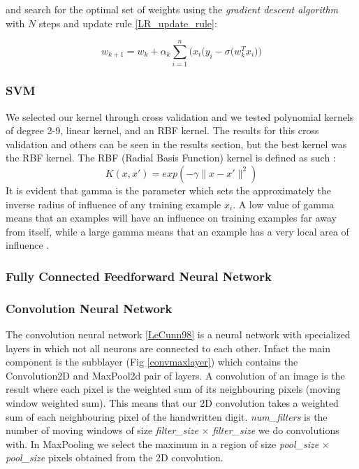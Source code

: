 \documentclass[conference]{IEEEtran}
\begin{document}
and search for the optimal set of weights using the \emph{gradient descent algorithm} with $N$ steps and update rule \ref{LR_update_rule}:

\begin{equation}
\label{LR_update_rule}
	w_{k+1} = w_k + \alpha_k \sum_{i=1}^n \Big( x_i\big(y_i - \sigma(w_k^Tx_i\big) \Big)
\end{equation}


\subsubsection{SVM}
We selected our kernel through cross validation and we tested polynomial kernels of degree 2-9, linear kernel, and an RBF kernel. The results for this cross validation and others can be seen in the results section, but the best kernel was the RBF kernel. The RBF (Radial Basis Function) kernel is defined as such \cite{Hastie}: \[K(x,x\prime )=exp(-\gamma\|x-x\prime \|^2)\] It is evident that gamma is the parameter which sets the approximately the inverse radius of influence of any training example $x_i$. A low value of gamma means that an examples will have an influence on training examples far away from itself, while a large gamma means that an example has a very local area of influence \cite{sklearn}.

\subsubsection{Fully Connected Feedforward Neural Network}

\subsubsection{Convolution Neural Network}
The convolution neural network \ref{LeCunn98} is a neural network with specialized layers in which not all neurons are connected to each other. Infact the main component is the subblayer (Fig \ref{convmaxlayer}) which contains the Convolution2D and MaxPool2d pair of layers. A convolution of an image is the result where each pixel is the weighted sum of its neighbouring pixels (moving window weighted sum). This means that our 2D convolution takes a weighted sum of each neighbouring pixel of the handwritten digit. \emph{num\_filters} is the number of moving windows of size \emph{filter\_size} $\times$ \emph{filter\_size} we do convolutions with. In MaxPooling we select the maximum in a region of size \emph{pool\_size} $\times$ \emph{pool\_size} pixels obtained from the 2D convolution.
\end{document}
